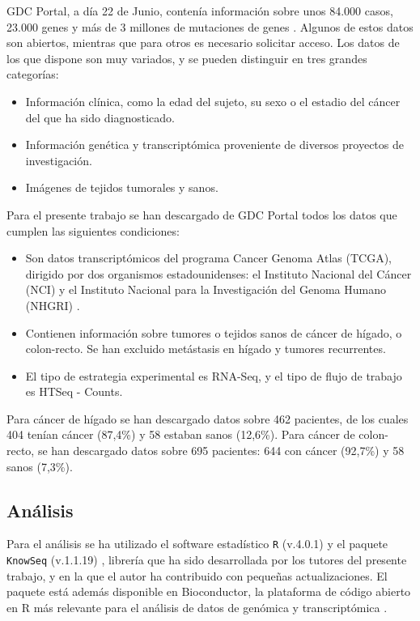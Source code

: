 GDC Portal, a día 22 de Junio, contenía información sobre unos 84.000 casos, 23.000 genes y más de 3 millones de mutaciones de genes \cite{GDCPortal}. Algunos de estos datos son abiertos, mientras que para otros es necesario solicitar acceso. Los datos de los que dispone son muy variados, y se pueden distinguir en tres grandes categorías:

\begin{itemize}
	\item Información clínica, como la edad del sujeto, su sexo o el estadio del cáncer del que ha sido diagnosticado.
	\item Información genética y transcriptómica proveniente de diversos proyectos de investigación.
	\item Imágenes de tejidos tumorales y sanos.
\end{itemize} 

Para el presente trabajo se han descargado de GDC Portal todos los datos que cumplen las siguientes condiciones:

\begin{itemize}
	\item Son datos transcriptómicos del programa Cancer Genoma Atlas (TCGA), dirigido por dos organismos estadounidenses: el Instituto Nacional del Cáncer (NCI) y el Instituto Nacional para la Investigación del Genoma Humano (NHGRI) \cite{NationalCancerInstitutea}. 
	\item Contienen información sobre tumores o tejidos sanos de cáncer de hígado, o colon-recto. Se han excluido metástasis en hígado y tumores recurrentes.
	\item El tipo de estrategia experimental es RNA-Seq, y el tipo de flujo de trabajo es HTSeq - Counts.
\end{itemize}

Para cáncer de hígado se han descargado datos sobre 462 pacientes, de los cuales 404 tenían cáncer (87,4\%) y 58 estaban sanos (12,6\%).  Para cáncer de colon-recto, se han descargado datos sobre 695 pacientes: 644 con cáncer (92,7\%) y 58 sanos (7,3\%).

\subsection{Análisis}

Para el análisis se ha utilizado el software estadístico \texttt{R} (v.4.0.1) \cite{R} y el paquete \texttt{KnowSeq} (v.1.1.19) \cite{KnowSeq}, librería que ha sido desarrollada por los tutores del presente trabajo, y en la que el autor ha contribuido con pequeñas actualizaciones. El paquete está además disponible en Bioconductor, la plataforma de código abierto en R más relevante para el análisis de datos de genómica y transcriptómica \cite{Gentleman2004}.\\

